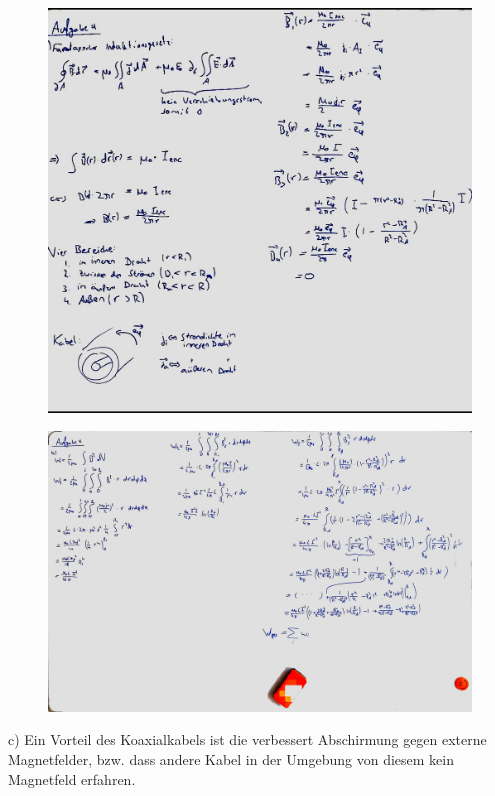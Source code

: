\documentclass[11pt a4paper]{article}
\begin{document}
\newpage

\begin{figure}[H]
	\centering
	\includegraphics[width=18cm]{4a.jpg}
\end{figure}

\begin{figure}[H]
	\centering
	\includegraphics[width=18cm]{4b.jpg}
\end{figure}

c) Ein Vorteil des Koaxialkabels ist die verbessert Abschirmung gegen externe Magnetfelder, bzw. dass andere
Kabel in der Umgebung von diesem kein Magnetfeld erfahren.
\end{document}
